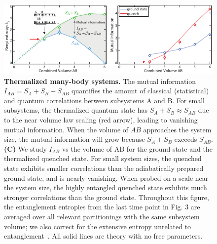 \begin{figure}
	\centering
	\includegraphics[scale=1.4]{figures/ETH_MI.pdf}
	\caption{{\bf Thermalized many-body systems.} The mutual information $I_{AB} = S_A + S_B - S_{AB}$ quantifies the amount of classical (statistical) and quantum correlations between subsystems A and B. For small subsystems, the thermalized quantum state has $S_A + S_B \approx S_{AB}$ due to the near volume law scaling (red arrow), leading to vanishing mutual information. When the volume of $AB$ approaches the system size, the mutual information will grow because $S_A + S_B$ exceeds $S_{AB}$. {\bf (C)} We study $I_{AB}$ vs the volume of AB for the ground state and the thermalized quenched state. For small system sizes, the quenched state exhibits smaller correlations than the adiabatically prepared ground state, and is nearly vanishing. When probed on a scale near the system size, the highly entangled quenched state exhibits much stronger correlations than the ground state. Throughout this figure, the entanglement entropies from the last time point in Fig. 3 are averaged over all relevant partitionings with the same subsystem volume; we also correct for the extensive entropy unrelated to entanglement~\cite{Supplement}. All solid lines are theory with no free parameters.}
	\label{fig:MI}
\end{figure} 

